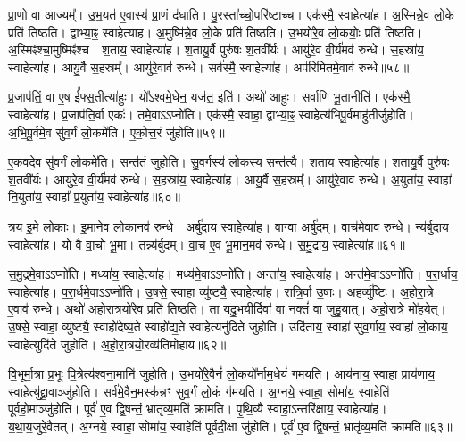 प्रा॒णो वा आज्यम्᳚।
उ॒भ॒यत॑ ए॒वास्य॑ प्रा॒णं द॑धाति।
पु॒रस्ता᳚च्चो॒परि॑ष्टाच्च।
एक॑स्मै॒ स्वाहेत्या॑ह।
अ॒स्मिन्ने॒व लो॒के प्रति॑ तिष्ठति।
द्वाभ्या॒ꣴ॒ स्वाहेत्या॑ह।
अ॒मुष्मि॑न्ने॒व लो॒के प्रति॑ तिष्ठति।
उ॒भयो॑रे॒व लो॒कयोः॒ प्रति॑ तिष्ठति।
अ॒स्मिꣴश्चा॒मुष्मिꣴ॑श्च।
श॒ताय॒ स्वाहेत्या॑ह।
श॒तायु॒र्वै पुरु॑षः श॒तवी᳚र्यः।
आयु॑रे॒व वी॒र्य॑मव॑ रुन्धे।
स॒हस्रा॑य॒ स्वाहेत्या॑ह।
आयु॒र्वै स॒हस्रम्᳚।
आयु॑रे॒वाव॑ रुन्धे।
सर्व॑स्मै॒ स्वाहेत्या॑ह।
अप॑रिमितमे॒वाव॑ रुन्धे॥५८॥\anuvakamend[ए॒व य॒ज्ञाद्रक्षा॒ꣴ॒स्यप॑हन्त्यन्त॒तो जु॑होति श॒ताय॒ स्वाहेत्या॑ह स॒प्त च॑]

प्र॒जा\-प॑तिं॒ वा ए॒ष ई᳚फ्स॒तीत्या॑हुः।
यो᳚ऽश्वमे॒धेन॒ यज॑त॒ इति॑।
अथो॑ आहुः।
सर्वा॑णि भू॒तानीति॑।
एक॑स्मै॒ स्वाहेत्या॑ह।
प्र॒जा\-प॑ति॒र्वा एकः॑।
तमे॒वाऽऽप्नो॑ति।
एक॑स्मै॒ स्वाहा॒ द्वाभ्या॒ꣴ॒ स्वाहेत्य॑भिपू॒र्वमाहु॑तीर्जुहोति।
अ॒भि॒पू॒र्वमे॒व सु॑व॒र्गं लो॒कमे॑ति।
ए॒को॒त्त॒रं जु॑होति॥५९॥

ए॒क॒वदे॒व सु॑व॒र्गं लो॒कमे॑ति।
सन्त॑तं जुहोति।
सु॒व॒र्गस्य॑ लो॒कस्य॒ सन्त॑त्यै।
श॒ताय॒ स्वाहेत्या॑ह।
श॒तायु॒र्वै पुरु॑षः श॒तवी᳚र्यः।
आयु॑रे॒व वी॒र्य॑मव॑ रुन्धे।
स॒हस्रा॑य॒ स्वाहेत्या॑ह।
आयु॒र्वै स॒हस्रम्᳚।
आयु॑रे॒वाव॑ रुन्धे।
अ॒युता॑य॒ स्वाहा॑ नि॒युता॑य॒ स्वाहा᳚ प्र॒युता॑य॒ स्वाहेत्या॑ह॥६०॥

त्रय॑ इ॒मे लो॒काः।
इ॒माने॒व लो॒कानव॑ रुन्धे।
अर्बु॑दाय॒ स्वाहेत्या॑ह।
वाग्वा अर्बु॑दम्।
वाच॑मे॒वाव॑ रुन्धे।
न्य॑र्बुदाय॒ स्वाहेत्या॑ह।
यो वै वा॒चो भू॒मा।
तन्न्य॑र्बुदम्।
वा॒च ए॒व भू॒मान॒मव॑ रुन्धे।
स॒मु॒द्राय॒ स्वाहेत्या॑ह॥६१॥

स॒मु॒द्रमे॒वाऽऽप्नो॑ति।
मध्या॑य॒ स्वाहेत्या॑ह।
मध्य॑मे॒वाऽऽप्नो॑ति।
अन्ता॑य॒ स्वाहेत्या॑ह।
अन्त॑मे॒वाऽऽप्नो॑ति।
प॒रा॒र्धाय॒ स्वाहेत्या॑ह।
प॒रा॒र्धमे॒वाऽऽप्नो॑ति।
उ॒षसे॒ स्वाहा॒ व्यु॑ष्ट्यै॒ स्वाहेत्या॑ह।
रात्रि॒र्वा उ॒षाः।
अह॒र्व्यु॑ष्टिः।
अ॒हो॒रा॒त्रे ए॒वाव॑ रुन्धे।
अथो॑ अहोरा॒त्रयो॑रे॒व प्रति॑ तिष्ठति।
ता यदु॒भयी॒र्दिवा॑ वा॒ नक्तं॑ वा जुहु॒यात्।
अ॒हो॒रा॒त्रे मो॑हयेत्।
उ॒षसे॒ स्वाहा॒ व्यु॑ष्ट्यै॒ स्वाहो॑देष्य॒ते स्वाहो᳚द्य॒ते स्वाहेत्यनु॑दिते जुहोति।
उदि॑ताय॒ स्वाहा॑ सुव॒र्गाय॒ स्वाहा॑ लो॒काय॒ स्वाहेत्युदि॑ते जुहोति।
अ॒हो॒रा॒त्रयो॒रव्य॑तिमोहाय॥६२॥\anuvakamend[ए॒को॒त्त॒रं जु॑होति प्र॒युता॑य॒ स्वाहेत्या॑ह समु॒द्राय॒ स्वाहेत्या॒हाह॒र्व्यु॑ष्टिः स॒प्त च॑]

वि॒भूर्मा॒त्रा प्र॒भूः पि॒त्रेत्य॑श्वना॒मानि॑ जुहोति।
उ॒भयो॑रे॒वैनं॑ लो॒कयो᳚र्नाम॒धेयं॑ गमयति।
आय॑नाय॒ स्वाहा॒ प्राय॑णाय॒ स्वाहेत्यु॑द्द्रा॒वाञ्जु॑होति।
सर्व॑मे॒वैन॒मस्क॑न्नꣳ सुव॒र्गं लो॒कं ग॑मयति।
अ॒ग्नये॒ स्वाहा॒ सोमा॑य॒ स्वाहेति॑ पूर्वहो॒माञ्जु॑होति।
पूर्व॑ ए॒व द्वि॒षन्तं॒ भ्रातृ॑व्य॒मति॑ क्रामति।
पृ॒थि॒व्यै स्वाहा॒\-ऽन्तरि॑क्षाय॒ स्वाहेत्या॑ह।
य॒था॒\-य॒जु\-रे॒वै\-तत्।
अ॒ग्नये॒ स्वाहा॒ सोमा॑य॒ स्वाहेति॑ पूर्वदी॒क्षा जु॑होति।
पूर्व॑ ए॒व द्वि॒षन्तं॒ भ्रातृ॑व्य॒मति॑ क्रामति॥६३॥


